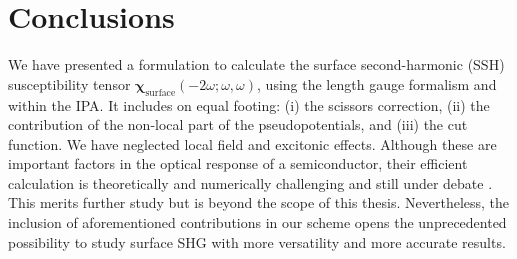 
\section{Conclusions}

We have presented a formulation to calculate the surface second-harmonic (SSH)
susceptibility tensor
$\boldsymbol{\chi}_{\mathrm{surface}}(-2\omega;\omega,\omega)$, using the length
gauge formalism and within the IPA. It includes on equal footing: (i) the
scissors correction, (ii) the contribution of the non-local part of the
pseudopotentials, and (iii) the cut function. We have neglected local field and
excitonic effects. Although these are important factors in the optical response
of a semiconductor, their efficient calculation is theoretically and numerically
challenging and still under debate \cite{beyond}. This merits further study but
is beyond the scope of this thesis. Nevertheless, the inclusion of
aforementioned contributions in our scheme opens the unprecedented possibility
to study surface SHG with more versatility and more accurate results.


\stopcontents[chapters]

